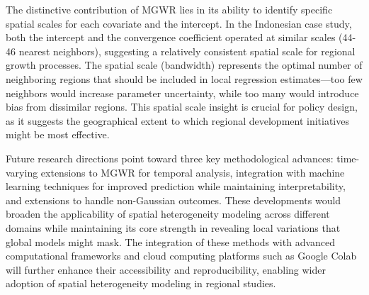 \documentclass[smallextended, natbib]{svjour3}       %
\begin{document}
The distinctive contribution of MGWR lies in its ability to identify specific spatial scales for each covariate and the intercept.
In the Indonesian case study, both the intercept and the convergence coefficient operated at similar scales (44-46 nearest neighbors), suggesting a relatively consistent spatial scale for regional growth processes. 
The spatial scale (bandwidth) represents the optimal number of neighboring regions that should be included in local regression estimates---too few neighbors would increase parameter uncertainty, while too many would introduce bias from dissimilar regions. 
This spatial scale insight is crucial for policy design, as it suggests the geographical extent to which regional development initiatives might be most effective.

Future research directions point toward three key methodological advances: time-varying extensions to MGWR for temporal analysis, integration with machine learning techniques for improved prediction while maintaining interpretability, and extensions to handle non-Gaussian outcomes. 
These developments would broaden the applicability of spatial heterogeneity modeling across different domains while maintaining its core strength in revealing local variations that global models might mask.
The integration of these methods with advanced computational frameworks and cloud computing platforms such as Google Colab will further enhance their accessibility and reproducibility, enabling wider adoption of spatial heterogeneity modeling in regional studies.






    

%
%
\end{document}
